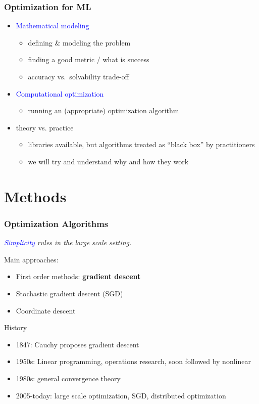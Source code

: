 \documentclass{beamer}
\begin{document}
\begin{frame}
  \frametitle{Optimization for ML}
  \begin{itemize}
    \item \textcolor{blue}{Mathematical modeling}
          \begin{itemize}
            \item defining \& modeling the problem
            \item finding a good metric / what is success
            \item accuracy vs.\ solvability trade-off
          \end{itemize}
    \item \textcolor{blue}{Computational optimization}
         \begin{itemize}
           \item running an (appropriate) optimization algorithm
         \end{itemize}
    \item theory vs. practice
          \begin{itemize}
            \item libraries available, but algorithms treated as ``black box'' by practitioners
            \item we will try and understand why and how they work
          \end{itemize}
  \end{itemize}
\end{frame}


\section{Methods}%

\begin{frame}
  \frametitle{Optimization Algorithms}
  \begin{center}
    \textit{\textcolor{blue}{Simplicity} rules in the large scale setting.}
  \end{center}
  Main approaches:
  \begin{itemize}
    \item First order methods: \textbf{gradient descent}
    \item Stochastic gradient descent (SGD)
    \item Coordinate descent
  \end{itemize}

  History
  \begin{itemize}
    \item 1847: Cauchy proposes gradient descent
    \item 1950s: Linear programming, operations research, soon followed by nonlinear
    \item 1980s: general convergence theory
    \item 2005-today: large scale optimization, SGD, distributed optimization
  \end{itemize}
\end{frame}
\end{document}
